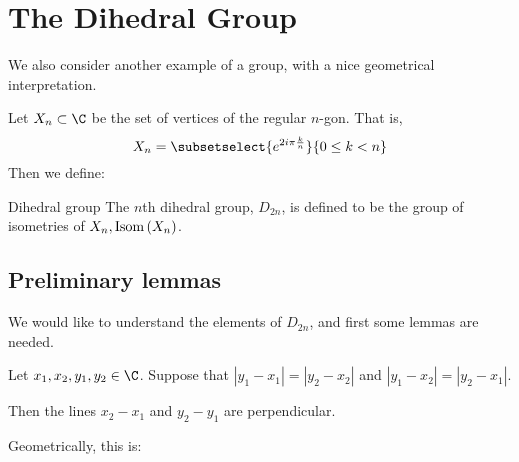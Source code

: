\documentclass[../Main.tex]{subfiles}
\begin{document}
\section{The Dihedral Group}
We also consider another example of a group, with a nice geometrical interpretation.\par
Let $X_n \subset \C$ be the set of vertices of the regular $n$-gon. That is,
\begin{equation}
    X_n = \subsetselect{e^{2i\pi\frac{k}{n}}}{0\leq k < n}
    \label{eqnXn}
\end{equation}
Then we define:
\begin{definition}{Dihedral group}
    The $n$th dihedral group, $D_{2n}$, is defined to be the group of isometries of $X_n, \operatorname{Isom}{(X_n)}$.
\end{definition}
\subsection{Preliminary lemmas}
We would like to understand the elements of $D_{2n}$, and first some lemmas are needed.
\begin{lemma}
    Let $x_1, x_2, y_1, y_2 \in \C$. Suppose that $|y_1 - x_1| = |y_2 - x_2|$ and $|y_1 - x_2| = |y_2 - x_1|$.\par
    Then the lines $x_2 - x_1$ and $y_2 - y_1$ are perpendicular.
    \label{lemKite}
\end{lemma}
Geometrically, this is:
\begin{center}
\end{center}
\end{document}

